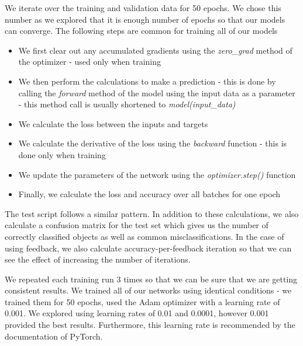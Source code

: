 \documentclass{l4proj}
\begin{document}
We iterate over the training and validation data for 50 epochs. We chose this number as we explored that it is enough number of epochs so that our models can converge.
The following steps are common for training all of our models
\begin{itemize}
    \item We first clear out any accumulated gradients using the \textit{zero\_grad} method of the optimizer - used only when training
    \item We then perform the calculations to make a prediction - this is done by calling the \textit{forward} method of the model using the input data as a parameter - this method call is usually shortened to \textit{model(input\_data)}
    \item We calculate the loss between the inputs and targets
    \item We calculate the derivative of the loss using the \textit{backward} function - this is done only when training
    \item We update the parameters of the network using the  \textit{optimizer.step()} function
    \item Finally, we calculate the loss and accuracy over all batches for one epoch
\end{itemize}

The test script follows a similar pattern. In addition to these calculations, we also calculate a confusion matrix for the test set which gives us the number of correctly classified objects as well as common misclassifications. In the case of using feedback, we also calculate accuracy-per-feedback iteration so that we can see the effect of increasing the number of iterations.

We repeated each training run 3 times so that we can be sure that we are getting consistent results. We trained all of our networks using identical conditions - we trained them for 50 epochs, used the Adam optimizer with a learning rate of 0.001. We explored using learning rates of 0.01 and 0.0001, however 0.001 provided the best results. Furthermore, this learning rate is recommended by the documentation of PyTorch.

\end{document}
